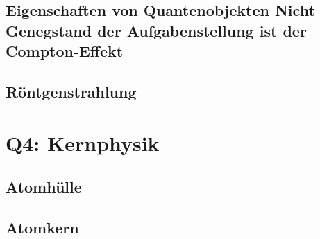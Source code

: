 \documentclass{article}
\begin{document}
    	\subsection{Eigenschaften von Quantenobjekten Nicht Genegstand der Aufgabenstellung ist der Compton-Effekt}
    	
    	\subsection{Röntgenstrahlung}

    \section{Q4: Kernphysik}
    
    	\subsection{Atomhülle}
    	
    	\subsection{Atomkern}
    	
\end{document}
